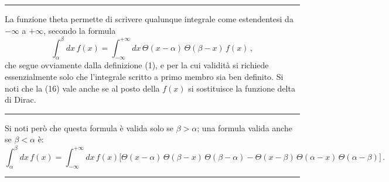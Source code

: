 \documentclass[11pt, a4paper]{book}
\numberwithin{equation}{section}
\begin{document}
\medskip\noindent\rule{\linewidth}{0.4pt}

La funzione theta permette di scrivere qualunque integrale come estendentesi da $-\infty$ a $+\infty$, secondo la formula
\begin{equation}
\int_{\alpha}^{\beta} dx\, f(x) = \int_{-\infty}^{+\infty} dx\, \Theta(x-\alpha)\,\Theta(\beta - x)\, f(x) \,, \tag{16}
\end{equation}
che segue ovviamente dalla definizione (1), e per la cui validità si richiede essenzialmente solo che l'integrale scritto a primo membro sia ben definito. Si noti che la (16) vale anche se al posto della $f(x)$ si sostituisce la funzione delta di Dirac.

\medskip\noindent\rule{\linewidth}{0.4pt}

Si noti però che questa formula è valida solo se $\beta > \alpha$; una formula valida anche se $\beta < \alpha$ è:
\[
\int_{\alpha}^{\beta} dx\, f(x) = \int_{-\infty}^{+\infty} dx\, f(x)\bigl[\Theta(x-\alpha)\,\Theta(\beta - x)\,\Theta(\beta - \alpha)
- \Theta(x - \beta)\,\Theta(\alpha - x)\,\Theta(\alpha - \beta)\bigr] \,.
\]

\medskip\noindent\rule{\linewidth}{0.4pt}
\end{document}
